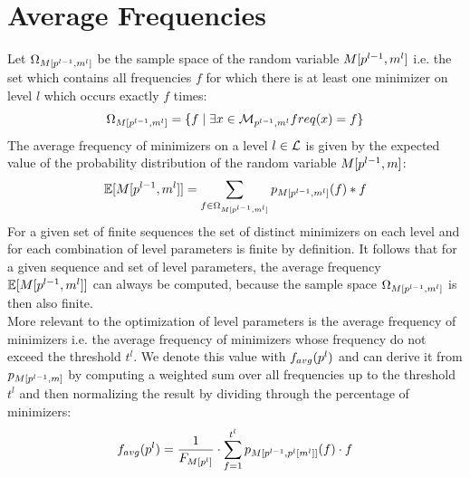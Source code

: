 \documentclass[a4paper,titlepage,onecolumn,oneside,12pt,nenglish,titlepage=firstiscover]{scrbook}
\theoremstyle{plain} %
\theoremstyle{definition} %
\theoremstyle{remark} %
\theoremstyle{plain}
\newcommand{\minimizerLength}{m}
\newcommand{\threshold}{t}
\newcommand{\level}{l}
\newcommand{\minimizer}{x}
\newcommand{\averageFrequency}{f_{avg}}
\begin{document}
\section{Average Frequencies} \label{sec:averagefrequencies}
Let $\Omega_{\manualZV{M}{\levelParameters{\level-1}}{\minimizerLength^\level}}$ be the sample space of the random variable $\manualZV{M}{\levelParameters{\level-1}}{\minimizerLength^\level}$ i.e. the set which contains all frequencies $f$ for which there is at least one minimizer on level $\level$ which occurs exactly $f$ times:
\begin{equation}
	\Omega_{\manualZV{M}{\levelParameters{\level-1}}{\minimizerLength^\level}} = \{f \mid \exists \minimizer \in \distinctMinimizers{\level} \frequencyOf{\minimizer} = f \}
\end{equation}
The average frequency of minimizers on a level $\level \in \setOfLevels$ is given by the expected value of the probability distribution of the random variable $\manualZV{M}{\levelParameters{\level-1}}{m}$:
\begin{equation}
	\mathbb{E}[\manualZV{M}{\levelParameters{\level-1}}{\minimizerLength^\level}] = \sum_{f \in \Omega_{\manualZV{M}{\levelParameters{\level-1}}{\minimizerLength^\level}}} \probabilityDistribution{\manualZV{M}{\levelParameters{\level-1}}{\minimizerLength^\level}}(f) * f
\end{equation}
For a given set of finite sequences the set of distinct minimizers on each level and for each combination of level parameters is finite by definition. It follows that for a given sequence and set of level parameters, the average frequency $\mathbb{E}[\manualZV{M}{\levelParameters{\level-1}}{\minimizerLength^\level}]$ can always be computed, because the sample space $\Omega_{\manualZV{M}{\levelParameters{\level-1}}{\minimizerLength^\level}}$ is then also finite.\\

More relevant to the optimization of level parameters is the average frequency of \infrequent minimizers i.e. the average frequency of minimizers whose frequency do not exceed the threshold $\threshold^\level$. We denote this value with $\averageFrequency(\levelParameters{\level})$ and can derive it from $\probabilityDistribution{\manualZV{M}{\levelParameters{\level-1}}{m}}$ by computing a weighted sum over all frequencies up to the threshold $\threshold^\level$ and then normalizing the result by dividing through the percentage of \infrequent minimizers:
\begin{equation} \label{equation:averageFrequency}
	\averageFrequency(\levelParameters{\level}) = \frac{1}{\CDF{\compactZV{M}{\levelParameters{\level}}}} \cdot
	\sum\limits_{f=1}^{\threshold^\level} \probabilityDistribution{\manualZV{M}{\levelParameters{\level-1}}{\parameterAccess{\level}{\minimizerLength}{\level}}}(f) \cdot f 
\end{equation}
\end{document}
